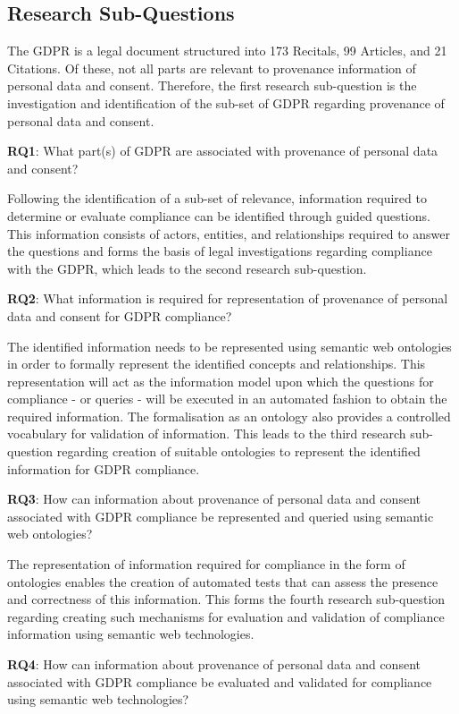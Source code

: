 \subsection{Research Sub-Questions}
The GDPR is a legal document structured into 173 Recitals, 99 Articles, and 21 Citations. Of these, not all parts are relevant to provenance information of personal data and consent. Therefore, the first research sub-question is the investigation and identification of the sub-set of GDPR regarding provenance of personal data and consent.
\begin{framed}
\textbf{RQ1}: What part(s) of GDPR are associated with provenance of personal data and consent?
\end{framed}
Following the identification of a sub-set of relevance, information required to determine or evaluate compliance can be identified through guided questions. This information consists of actors, entities, and relationships required to answer the questions and forms the basis of legal investigations regarding compliance with the GDPR, which leads to the second research sub-question.
\begin{framed}
\textbf{RQ2}: What information is required for representation of provenance of personal data and consent for GDPR compliance?
\end{framed}
The identified information needs to be represented using semantic web ontologies in order to formally represent the identified concepts and relationships. This representation will act as the information model upon which the questions for compliance - or queries - will be executed in an automated fashion to obtain the required information. The formalisation as an ontology also provides a controlled vocabulary for validation of information. This leads to the third research sub-question regarding creation of suitable ontologies to represent the identified information for GDPR compliance.
\begin{framed}
\textbf{RQ3}: How can information about provenance of personal data and consent associated with GDPR compliance be represented and queried using semantic web ontologies?
\end{framed}
The representation of information required for compliance in the form of ontologies enables the creation of automated tests that can assess the presence and correctness of this information. This forms the fourth research sub-question regarding creating such mechanisms for evaluation and validation of compliance information using semantic web technologies.
\begin{framed}
\textbf{RQ4}: How can information about provenance of personal data and consent associated with GDPR compliance be evaluated and validated for compliance using semantic web technologies?
\end{framed}
